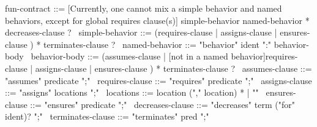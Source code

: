 \begin{syntax}
  fun-contract ::= {[Currently, one cannot mix a simple behavior and
    named behaviors, except for global requires clause(s)]
                simple-behavior named-behavior * decreases-clause ?}
  \
  simple-behavior ::= (requires-clause | assigns-clause |
  ensures-clause ) * terminates-clause ?
  \
  named-behavior ::= "behavior" ident ":" behavior-body
  \
  behavior-body ::= (assumes-clause |
                     {[not in a named behavior]requires-clause}
                    | assigns-clause |
                      ensures-clause ) *
                    terminates-clause ?
              \
  assumes-clause ::= "assumes" predicate ";"
  \
  requires-clause ::= "requires" predicate ";"
  \
  assigns-clause ::= "assigns" locations ";"
  \
  locations ::= location ("," location) * | "\nothing"
  \
  ensures-clause ::= "ensures" predicate ";"
  \
  decreases-clause ::= "decreases" term ("for" ident)? ";"
  \
  terminates-clause ::= "terminates" pred ";"
\end{syntax}
